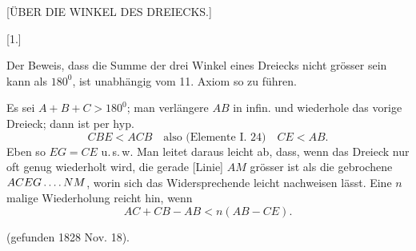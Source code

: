 \clearpage
\begin{center}
[ÜBER DIE WINKEL DES DREIECKS.]
\end{center}

\begin{center}
[1.]
\end{center}

Der Beweis, dass die Summe der drei Winkel eines Dreiecks nicht grösser sein
kann als $180^{0}$, ist unabhängig vom 11. Axiom so zu führen.



\begin{center}

\end{center}

Es sei $A+B+C>180^{0}$; man verlängere $AB$ in infin. und wiederhole das
vorige Dreieck; dann ist per hyp.
\[
CBE < ACB \quad \text{also (Elemente I. 24)} \quad CE < AB.
\]
Eben so $EG=CE$ u.\,s.\,w. Man leitet daraus leicht ab, dass, wenn das
Dreieck nur oft genug wiederholt wird, die gerade [Linie] $AM$ grösser ist
als die gebrochene $ACEG\mathinner{.\,.\,.\,.}NM$, worin sich das Widersprechende leicht
nachweisen lässt. Eine $n$malige Wiederholung reicht hin, wenn
\[AC+CB-AB < n(AB-CE).\]

(gefunden 1828 Nov. 18).

